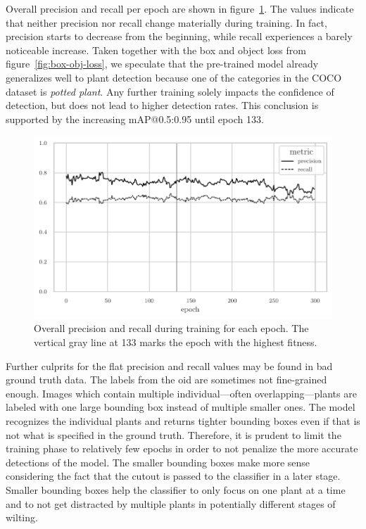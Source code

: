 \documentclass[draft,final]{vutinfth} %
\begin{document}
Overall precision and recall per epoch are shown in
figure~\ref{fig:prec-rec}. The values indicate that neither precision
nor recall change materially during training. In fact, precision
starts to decrease from the beginning, while recall experiences a
barely noticeable increase. Taken together with the box and object
loss from figure~\ref{fig:box-obj-loss}, we speculate that the
pre-trained model already generalizes well to plant detection because
one of the categories in the COCO~\cite{lin2015} dataset is
\emph{potted plant}. Any further training solely impacts the
confidence of detection, but does not lead to higher detection
rates. This conclusion is supported by the increasing
\textsf{mAP}@0.5:0.95 until epoch 133.

\begin{figure}
  \centering
  \includegraphics{graphics/precision_recall.pdf}
  \caption[Object detection precision and recall during
  training.]{Overall precision and recall during training for each
    epoch. The vertical gray line at 133 marks the epoch with the
    highest fitness.}
  \label{fig:prec-rec}
\end{figure}

Further culprits for the flat precision and recall values may be found
in bad ground truth data. The labels from the \gls{oid} are sometimes not
fine-grained enough. Images which contain multiple individual—often
overlapping—plants are labeled with one large bounding box instead of
multiple smaller ones. The model recognizes the individual plants and
returns tighter bounding boxes even if that is not what is specified
in the ground truth. Therefore, it is prudent to limit the training
phase to relatively few epochs in order to not penalize the more
accurate detections of the model. The smaller bounding boxes make more
sense considering the fact that the cutout is passed to the classifier
in a later stage. Smaller bounding boxes help the classifier to only
focus on one plant at a time and to not get distracted by multiple
plants in potentially different stages of wilting.
\end{document}
